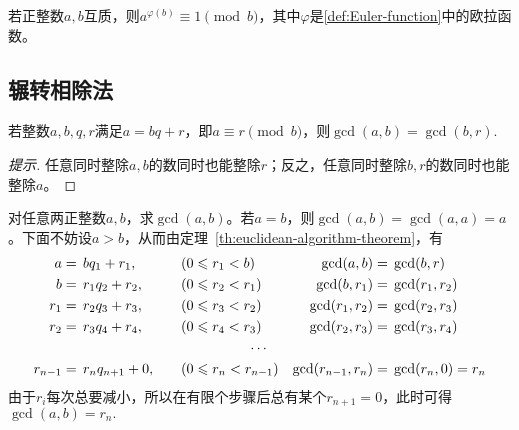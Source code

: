 \begin{corollary}
  若正整数$a,b$互质，则$a^{\varphi(b)}\equiv1\pmod b$，其中$\varphi$是\ref{def:Euler-function}中的欧拉函数。
\end{corollary}


\subsection{辗转相除法}
\label{sec:Euclidean-algorithm}

\begin{theorem}\label{th:euclidean-algorithm-theorem}
  若整数$a,b,q,r$满足$a=bq+r$，即$a\equiv r\pmod b$，则$\gcd(a,b)=\gcd(b,r).$
\end{theorem}
\begin{proof}[提示]
  任意同时整除$a,b$的数同时也能整除$r$；反之，任意同时整除$b,r$的数同时也能整除$a$。
\end{proof}

\begin{definition}[辗转相除法]
  对任意两正整数$a,b$，求$\gcd(a,b)$。若$a=b$，则$\gcd(a,b)=\gcd(a,a)=a$。下面不妨设$a>b$，从而由定理~\ref{th:euclidean-algorithm-theorem}，有
  \begin{align*}
    a&=  \,bq_1 + r_1,   &&\quad(0\le r_1 < b)   & \gcd(a,b)    &=\,\gcd(b,r)\\
    b&=  \,r_1q_2 + r_2, &&\quad(0\le r_2 < r_1) & \gcd(b,r_1)  &=\,\gcd(r_1, r_2)\\ 
    r_1&=\,r_2q_3 + r_3, &&\quad(0\le r_3 < r_2) & \gcd(r_1,r_2)&=\,\gcd(r_2, r_3)\\
    r_2&=\,r_3q_4 + r_4, &&\quad(0\le r_4 < r_3) & \gcd(r_2,r_3)&=\,\gcd(r_3, r_4)\\
    \multicolumn{7}{c}{$\cdots$}\\
    r_{n-1}&=\,r_nq_{n+1} + 0, &&\quad(0\le r_n < r_{n-1}) & \gcd(r_{n-1},r_n)&=\,\gcd(r_{n}, 0)=r_{n}
  \end{align*}
  由于$r_i$每次总要减小，所以在有限个步骤后总有某个$r_{n+1}=0$，此时可得$\gcd(a,b)=r_n.$
\end{definition}

